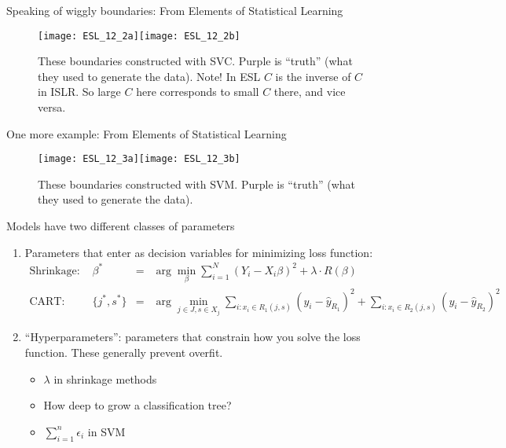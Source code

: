 \documentclass[mathserif, aspectratio=169]{beamer}
\begin{document}
\begin{frame}{Speaking of wiggly boundaries: From Elements of Statistical Learning}

	\begin{figure}
		\texttt{[image: ESL\_12\_2a]}\texttt{[image: ESL\_12\_2b]}
		\caption*{These boundaries constructed with SVC.  Purple is ``truth'' (what they used to generate the data).  Note!  In ESL $C$ is the inverse of $C$ in ISLR.  So large $C$ here corresponds to small $C$ there, and vice versa.}
	\end{figure}

\end{frame}

\begin{frame}{One more example: From Elements of Statistical Learning}

	\begin{figure}
		\texttt{[image: ESL\_12\_3a]}\texttt{[image: ESL\_12\_3b]}
		\caption*{These boundaries constructed with SVM. Purple is ``truth'' (what they used to generate the data).  }
	\end{figure}

\end{frame}

\begin{frame}{Models have two different classes of parameters}
	\begin{enumerate}
		\item Parameters that enter as decision variables for minimizing loss function:
		\begin{align*}
			\text{Shrinkage: } & \beta^*  &=& \arg \min_\beta \sum_{i=1}^N \left(Y_i - X_i \beta \right)^2+\lambda \cdot R(\beta)\\
			\text{CART: } & \{j^*,s^*\}  &=& \arg \min_{j\in J, s\in X_j} \sum_{i:x_i\in R_1(j,s)} (y_i-\hat{y}_{R_1})^2 + \sum_{i:x_i\in R_2(j,s)} (y_i-\hat{y}_{R_2})^2
		\end{align*}
		\item ``Hyperparameters'': parameters that constrain how you solve the loss function.  These generally prevent overfit.
		\begin{itemize} \pause
			\item $\lambda$ in shrinkage methods
			\item How deep to grow a classification tree?
			\item $\sum_{i=1}^n \epsilon_i$ in SVM
		\end{itemize}
	\end{enumerate}
	
\end{frame}
\end{document}
